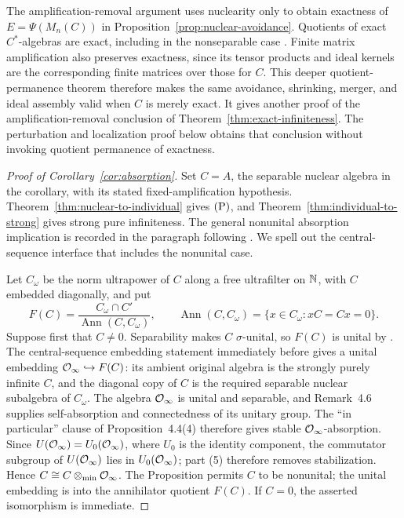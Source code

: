 \begin{remark}
\label{rem:tuple-exact}
The amplification-removal argument uses nuclearity only to obtain
exactness of \(E=\Psi(M_n(C))\) in
Proposition~\ref{prop:nuclear-avoidance}.  Quotients of exact
\(C^*\)-algebras are exact, including in the nonseparable case
\cite[IV.3.4.20]{Blackadar}.  Finite matrix amplification also
preserves exactness, since its tensor products and ideal kernels
are the corresponding finite matrices over those for \(C\).
This deeper quotient-permanence theorem therefore makes the same
avoidance, shrinking, merger, and ideal assembly valid when \(C\)
is merely exact.  It gives another proof of the amplification-removal
conclusion of Theorem~\ref{thm:exact-infiniteness}.  The perturbation
and localization proof below obtains that conclusion without invoking
quotient permanence of exactness.
\end{remark}

\begin{proof}[Proof of Corollary~\ref{cor:absorption}]
Set \(C=A\), the separable nuclear algebra in the corollary, with
its stated fixed-amplification hypothesis.
Theorem~\ref{thm:nuclear-to-individual} gives \(\textup{(P)}\), and
Theorem~\ref{thm:individual-to-strong} gives strong pure infiniteness.
The general nonunital absorption implication is recorded in the
paragraph following \cite[Definition~3.1]{KS}.  We spell out the
central-sequence interface that includes the nonunital case.

Let \(C_\omega\) be the norm ultrapower of \(C\) along a free
ultrafilter on \(\mathbb N\), with \(C\) embedded diagonally, and put
\[
 F(C)=\frac{C_\omega\cap C'}{\operatorname{Ann}(C,C_\omega)},
 \qquad
 \operatorname{Ann}(C,C_\omega)
 =\{x\in C_\omega:xC=Cx=0\}.
\]
Suppose first that \(C\ne0\).  Separability makes \(C\)
\(\sigma\)-unital, so \(F(C)\) is unital by
\cite[Corollary~1.10(1)]{Kirchberg2006}.  The central-sequence embedding
statement immediately before \cite[Proposition~4.4]{Kirchberg2006}
gives a unital embedding \(\mathcal O_\infty\hookrightarrow F(C)\): its ambient
original algebra is the strongly purely infinite \(C\), and the
diagonal copy of \(C\) is the required separable nuclear subalgebra
of \(C_\omega\).  The algebra \(\mathcal O_\infty\) is unital and separable, and
Remark~4.6 supplies self-absorption and connectedness of its unitary
group.  The ``in particular'' clause of Proposition~4.4(4) therefore
gives stable \(\mathcal O_\infty\)-absorption.  Since \(U(\mathcal O_\infty)=U_0(\mathcal O_\infty)\), where \(U_0\)
is the identity component, the commutator subgroup of \(U(\mathcal O_\infty)\)
lies in \(U_0(\mathcal O_\infty)\); part (5) therefore removes stabilization.  Hence
\(C\cong C\otimes_{\min}\mathcal O_\infty\).  The Proposition permits \(C\) to
be nonunital; the unital embedding is into the annihilator quotient
\(F(C)\).  If \(C=0\), the asserted isomorphism is immediate.
\end{proof}
